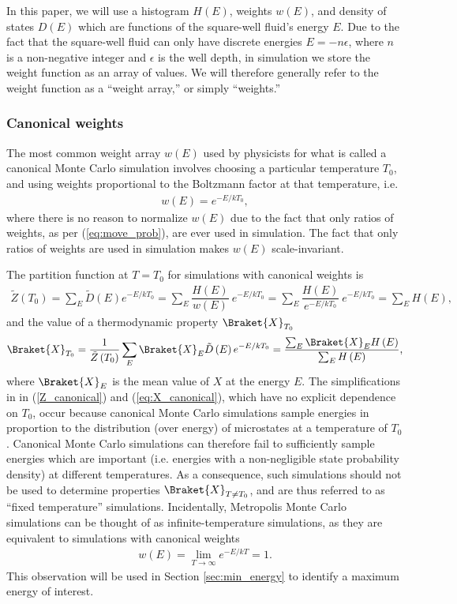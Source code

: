 \documentclass[11pt]{article}
\newcommand{\bk}{\Braket} %
\newcommand{\f}[2]{\dfrac{#1}{#2}} %
\newcommand{\p}[1]{\left(#1\right)} %
\begin{document}
In this paper, we will use a histogram $H\p{E}$, weights $w\p{E}$, and
density of states $D\p{E}$ which are functions of the square-well
fluid's energy $E$. Due to the fact that the square-well fluid can
only have discrete energies $E=-n\epsilon$, where $n$ is a
non-negative integer and $\epsilon$ is the well depth, in simulation
we store the weight function as an array of values. We will therefore
generally refer to the weight function as a ``weight array,'' or
simply ``weights.''

\subsubsection{Canonical weights}
\label{sec:canonical_weights}

The most common weight array $w\p{E}$ used by physicists for what is
called a canonical Monte Carlo simulation involves choosing a
particular temperature $T_0$, and using weights proportional to the
Boltzmann factor at that temperature, i.e.
\begin{align}
  w\p{E}=e^{-E/kT_0},
\end{align}
where there is no reason to normalize $w\p{E}$ due to the fact that
only ratios of weights, as per (\ref{eq:move_prob}), are ever used in
simulation. The fact that only ratios of weights are used in
simulation makes $w\p{E}$ scale-invariant.

The partition function at $T=T_0$ for simulations with canonical
weights is
\begin{align}
  \tilde Z\p{T_0}=\sum_E\tilde D\p{E}e^{-E/kT_0}
  =\sum_E\f{H\p{E}}{w\p{E}}~e^{-E/kT_0}
  =\sum_E\f{H\p{E}}{e^{-E/kT_0}}~e^{-E/kT_0}=\sum_EH\p{E},
  \label{Z_canonical}
\end{align}
and the value of a thermodynamic property $\bk{X}_{T_0}$
\begin{align}
  \bk{X}_{T_0}=\f1{\tilde Z\p{T_0}}\sum_E\bk{X}_E\tilde
  D\p{E}e^{-E/kT_0} =\f{\sum_E\bk{X}_EH\p{E}}{\sum_EH\p{E}},
  \label{eq:X_canonical}
\end{align}
where $\bk{X}_E$ is the mean value of $X$ at the energy $E$. The
simplifications in in (\ref{Z_canonical}) and (\ref{eq:X_canonical}),
which have no explicit dependence on $T_0$, occur because canonical
Monte Carlo simulations sample energies in proportion to the
distribution (over energy) of microstates at a temperature of $T_0$.
Canonical Monte Carlo simulations can therefore fail to sufficiently
sample energies which are important (i.e. energies with a
non-negligible state probability density) at different
temperatures. As a consequence, such simulations should not be used to
determine properties $\bk{X}_{T\ne T_0}$, and are thus referred to as
``fixed temperature'' simulations. Incidentally, Metropolis Monte
Carlo simulations can be thought of as infinite-temperature
simulations, as they are equivalent to simulations with canonical
weights
\begin{align}
  w\p{E}=\lim_{T\to\infty}e^{-E/kT}=1.
  \label{eq:inf_temp_weights}
\end{align}
This observation will be used in Section \ref{sec:min_energy} to
identify a maximum energy of interest.
\end{document}
